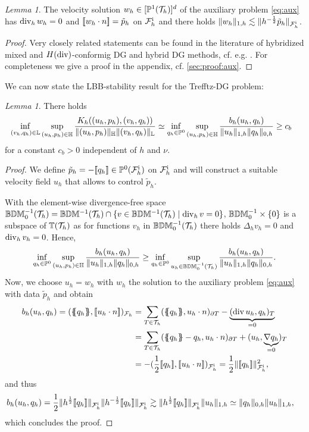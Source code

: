 \documentclass[sn-mathphys,Numbered]{sn-jnl}%
\theoremstyle{remark}%
\newtheorem{lemma}[theorem]{Lemma}
\theoremstyle{definition}%
\begin{document}
\begin{lemma}\label{lem:aux}
  The velocity solution $w_h \in [\mathbb{P}^1({\mathcal{T}_h})]^d$ of the auxiliary problem \eqref{eq:aux} has $\operatorname{\mathrm{div}}_h w_h = 0$ and $[\![w_h \cdot n]\!] = \tilde{p}_h$ on ${\mathcal{F}_h^{\text{i}}}$ and there holds $\Vert w_h \Vert_{1,h} \lesssim \Vert h^{-\frac12}\tilde{p}_h \Vert_{{\mathcal{F}_h^{\text{i}}}}$.
\end{lemma}
\begin{proof}
  Very closely related statements can be found in the literature of hybridized mixed and $H(\operatorname{\mathrm{div}})$-conformig DG and hybrid DG methods, cf. e.g. \cite{cockburn2005locally,cockburn2007note}. For completeness we give a proof in the appendix, cf. \cref{sec:proof:aux}.
\end{proof}

We can now state the LBB-stability result for the Trefftz-DG problem:
\begin{lemma}\label{lem:LBB}
  There holds
  \begin{align*}
    &  \inf_{(v_h,q_h) \in \mathbb{L}} \sup_{(u_h,p_h) \in \mathbb{H}} \frac{K_h((u_h,p_h),(v_h,q_h))}{\Vert (u_h,p_h) \Vert_{\mathbb{H}} \Vert (v_h,q_h) \Vert_{\mathbb{L}}}  \simeq
    \inf_{q_h \in \mathbb{P}^0} \sup_{(u_h,p_h) \in \mathbb{H}} \frac{b_h(u_h,q_h)}{\Vert u_h \Vert_{1,h} \Vert q_h \Vert_{0,h}}
    \geq c_b
  \end{align*}
  for a constant $c_b > 0$ independent of $h$ and $\nu$.
\end{lemma}
\begin{proof}
  We define $\tilde{p}_h = -[\![q_h]\!] \in \mathbb{P}^0({\mathcal{F}_h^{\text{i}}})$ on ${\mathcal{F}_h^{\text{i}}}$ and will construct a suitable velocity field $u_h$ that allows to control $\tilde{p}_h$.

  With the element-wise divergence-free space $\mathbb{B}\mathbb{D}\mathbb{M}^{-1}_0({\mathcal{T}_h}) = \mathbb{B}\mathbb{D}\mathbb{M}^{-1}({\mathcal{T}_h}) \cap \{v \in \mathbb{B}\mathbb{D}\mathbb{M}^{-1}({\mathcal{T}_h}) \mid \operatorname{\mathrm{div}}_h v = 0\}$, $\mathbb{B}\mathbb{D}\mathbb{M}^{-1}_0 \times \{0\}$ is a subspace of $\mathbb{T}({\mathcal{T}_h})$
  as for functions $v_h$ in $\mathbb{B}\mathbb{D}\mathbb{M}^{-1}_0({\mathcal{T}_h})$ there holds $\Delta_h v_h = 0$ and $\operatorname{\mathrm{div}}_h v_h = 0 $.
  Hence,  
  $$
  \inf_{q_h \in \mathbb{P}^0} \sup_{(u_h,p_h) \in \mathbb{H}} \frac{b_h(u_h,q_h)}{\Vert u_h \Vert_{1,h} \Vert q_h \Vert_{0,h}}
  \geq \inf_{q_h \in \mathbb{P}^0} \sup_{u_h \in \mathbb{B}\mathbb{D}\mathbb{M}^{-1}_0({\mathcal{T}_h})} \frac{b_h(u_h,q_h)}{\Vert u_h \Vert_{1,h} \Vert q_h \Vert_{0,h}}.
  $$
  Now, we choose $u_h=w_h$ with $w_h$ the solution to the auxiliary problem \eqref{eq:aux} with data $\tilde{p}_h$ and obtain
  \begin{align*}
    b_h(u_h,q_h)  = (\avg{q_h}, \jmp{u_h \cdot n})_{\Fh}  
    &=
    \sum_{T\in\Th} (\avg{q_h}, u_h \cdot n)_{\partial T} - \underbrace{(\Div u_h, q_h)_T}_{=0} \\
    & =\sum_{T\in\Th} (\avg{q_h}-q_h, u_h \cdot n)_{\partial T} + ( u_h, \underbrace{ \nabla q_h}_{=0})_T  \\
    &= -(\frac12 \jmp{q_h}, \jmp{u_h \cdot n})_{\Fhi} = \frac12 \nrm{\jmp{q_h}}_{\Fhi}^2,
  \end{align*}
  and thus 
  \begin{align*}
    b_h(u_h,q_h) & = \frac12 \Vert h^{\frac12}[\![q_h]\!] \Vert_{{\mathcal{F}_h^{\text{i}}}} \Vert h^{-\frac12}[\![q_h]\!] \Vert_{{\mathcal{F}_h^{\text{i}}}} \gtrsim \Vert h^{\frac12}[\![q_h]\!] \Vert_{{\mathcal{F}_h^{\text{i}}}} \Vert u_h \Vert_{1,h} \simeq \Vert q_h \Vert_{0,h} \Vert u_h \Vert_{1,h},
  \end{align*}
  which concludes the proof.
\end{proof}
\end{document}
